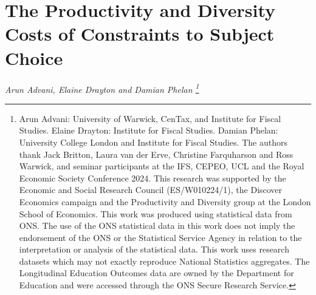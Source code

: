 \chapter{The Productivity and Diversity Costs of Constraints to Subject Choice}
\label{ch:paper3}
\resetcounterformats

\begin{center}
  \textit{Arun Advani, Elaine Drayton and Damian Phelan%
    \footnote{Arun Advani: University of Warwick, CenTax, and Institute for
      Fiscal Studies. Elaine Drayton: Institute for Fiscal Studies. Damian
      Phelan: University College London and Institute for Fiscal Studies.
      The authors thank Jack Britton, Laura van der Erve, Christine
      Farquharson and Ross Warwick, and seminar participants at the IFS,
      CEPEO, UCL and the Royal Economic Society Conference 2024. This
      research was supported by the Economic and Social Research Council
      (ES/W010224/1), the Discover Economics campaign and the Productivity
      and Diversity group at the London School of Economics. This work was
      produced using statistical data from ONS. The use of the ONS
      statistical data in this work does not imply the endorsement of the
      ONS or the Statistical Service Agency in relation to the
      interpretation or analysis of the statistical data. This work uses
      research datasets which may not exactly reproduce National Statistics
      aggregates. The Longitudinal Education Outcomes data are owned by the
      Department for Education and were accessed through the ONS Secure
      Research Service.}}
\end{center}

